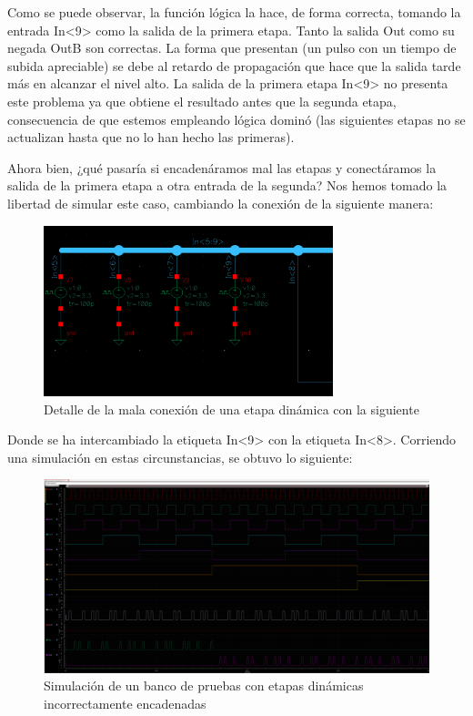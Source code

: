 Como se puede observar, la función lógica la hace, de forma correcta, tomando la entrada In<9> como la salida de la primera etapa.  \newpage Tanto la salida Out como su negada OutB son correctas. La forma que presentan (un pulso con un tiempo de subida apreciable) se debe al retardo de propagación que hace que la salida tarde más en alcanzar el nivel alto. La salida de la primera etapa In<9> no presenta este problema ya que obtiene el resultado antes que la segunda etapa, consecuencia de que estemos empleando lógica dominó (las siguientes etapas no se actualizan hasta que no lo han hecho las primeras).

Ahora bien, ¿qué pasaría si encadenáramos mal las etapas y conectáramos la salida de la primera etapa a otra entrada de la segunda? Nos hemos tomado la libertad de simular este caso, cambiando la conexión  de la siguiente manera:
\begin{figure}[H]%
\begin {center}
\includegraphics[width=0.75\textwidth]{figures/BlockDynBadSchem.PNG}
\caption{Detalle de la mala conexión de una etapa dinámica con la siguiente}
\label{fig:SchemBadEnc}
\end {center}
\end{figure}
Donde se ha intercambiado la etiqueta In<9> con la etiqueta In<8>. Corriendo una simulación en estas circunstancias, se obtuvo lo siguiente:
\begin{figure}[H]%
\hspace{-10mm}
\includegraphics[width=1.2\textwidth]{figures/GraphEncBad.png}
\caption{Simulación de un banco de pruebas con etapas dinámicas incorrectamente encadenadas}
\label{fig:GraphBadEnc}

\end{figure}

